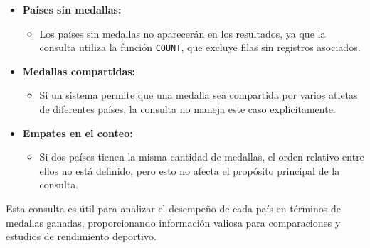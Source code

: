 \begin{itemize} \item \textbf{Países sin medallas:} \begin{itemize} \item Los países sin medallas no aparecerán en los resultados, ya que la consulta utiliza la función \texttt{COUNT}, que excluye filas sin registros asociados. \end{itemize}
	
	\item \textbf{Medallas compartidas:} \begin{itemize} \item Si un sistema permite que una medalla sea compartida por varios atletas de diferentes países, la consulta no maneja este caso explícitamente. \end{itemize}
	
	\item \textbf{Empates en el conteo:} \begin{itemize} \item Si dos países tienen la misma cantidad de medallas, el orden relativo entre ellos no está definido, pero esto no afecta el propósito principal de la consulta. \end{itemize} \end{itemize}

Esta consulta es útil para analizar el desempeño de cada país en términos de medallas ganadas, proporcionando información valiosa para comparaciones y estudios de rendimiento deportivo.